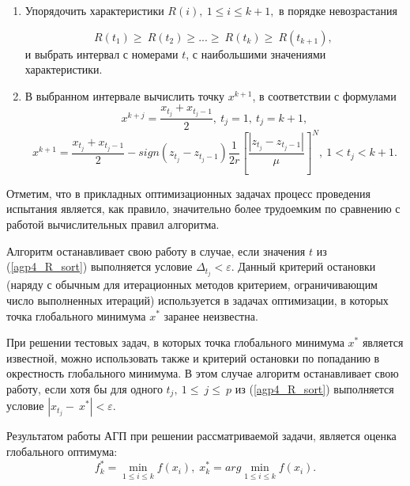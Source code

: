\documentclass[12pt, a4paper, russian]{article}
\begin{document}
\begin{enumerate}
	\item   Упорядочить характеристики $R\left(i\right),\ 1\leq i \leq k+1,$ в порядке невозрастания 
	
	\begin{equation}
		\label{agp4_R_sort}
	R\left(t_1\right)\geq\ R\left(t_2\right)\geq...\geq\ R\left(t_k\right)\geq\ R(t_{k+1}),\ 
	\end{equation}	
	и выбрать интервал с номерами $t$, с наибольшими значениями характеристики.

	\item  В выбранном интервале вычислить точку $x^{k+1}$, в соответствии с формулами
	\begin{displaymath}
		\label{agp5_x1}
	x^{k+j}=\frac{x_{t_j}+x_{t_j-1}}{2},\ t_j=1,\ t_j=k+1,
	\end{displaymath}	
	\begin{displaymath}
		\label{agp4_xi}	
	x^{k+1}=\frac{x_{t_j}+x_{t_j-1}}{2}-sign\left(z_{t_j}-z_{t_j-1}\right)\frac{1}{2r}\left[\frac{\left|z_{t_j}-z_{t_j-1}\right|}{\mu}\right]^N,\ 1<t_j<k+1.
	\end{displaymath}	

\end{enumerate}

Отметим, что в прикладных оптимизационных задачах процесс проведения испытания является, как правило, значительно более трудоемким по сравнению с работой вычислительных правил алгоритма.

Алгоритм останавливает свою работу в случае, если значения $t$ из (\ref{agp4_R_sort}) выполняется условие \(\Delta_{t_j} < \varepsilon\). Данный критерий остановки (наряду с обычным для итерационных методов критерием, ограничивающим число выполненных итераций) используется в задачах оптимизации, в которых точка глобального минимума $x^*$ заранее неизвестна. 
	 
При решении тестовых задач, в которых точка глобального минимума $x^*$ является  известной, можно использовать также и критерий остановки по попаданию в окрестность глобального минимума. В этом случае алгоритм останавливает свою работу, если хотя бы для одного $t_j,\ 1\le\ j\le\ p$ из (\ref{agp4_R_sort}) выполняется условие $\left|x_{t_j}-\ x^\ast\right| < \varepsilon.$
	
Результатом работы АГП при решении рассматриваемой задачи, является оценка глобального оптимума:
\begin{displaymath}
	f_k^*=\min_{1\leq i \leq k}f(x_i), \; x_k^*=arg \min_{1\leq i \leq k}f(x_i).
\end{displaymath}
\end{document}
